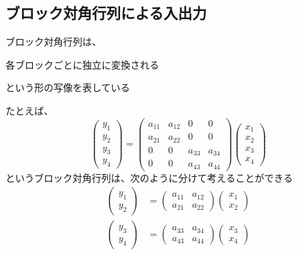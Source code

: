 \documentclass[../../../topic_linear-algebra]{subfiles}
\begin{document}
\subsection{ブロック対角行列による入出力}

ブロック対角行列は、
\begin{shaded}
  各ブロックごとに独立に変換される
\end{shaded}
という形の写像を表している

\br

たとえば、
\begin{equation*}
  \begin{pmatrix}
    y_1 \\
    y_2 \\
    y_3 \\
    y_4
  \end{pmatrix} = \begin{pmatrix}
    a_{11} & a_{12} & 0      & 0      \\
    a_{21} & a_{22} & 0      & 0      \\
    0      & 0      & a_{33} & a_{34} \\
    0      & 0      & a_{43} & a_{44}
  \end{pmatrix}
  \begin{pmatrix}
    x_1 \\
    x_2 \\
    x_3 \\
    x_4
  \end{pmatrix}
\end{equation*}
というブロック対角行列は、次のように分けて考えることができる
\begin{align*}
  \begin{pmatrix}
    y_1 \\
    y_2
  \end{pmatrix} & = \begin{pmatrix}
                      a_{11} & a_{12} \\
                      a_{21} & a_{22}
                    \end{pmatrix}
  \begin{pmatrix}
    x_1 \\
    x_2
  \end{pmatrix}                    \\
  \begin{pmatrix}
    y_3 \\
    y_4
  \end{pmatrix} & = \begin{pmatrix}
                      a_{33} & a_{34} \\
                      a_{43} & a_{44}
                    \end{pmatrix}
  \begin{pmatrix}
    x_3 \\
    x_4
  \end{pmatrix}
\end{align*}
\end{document}
